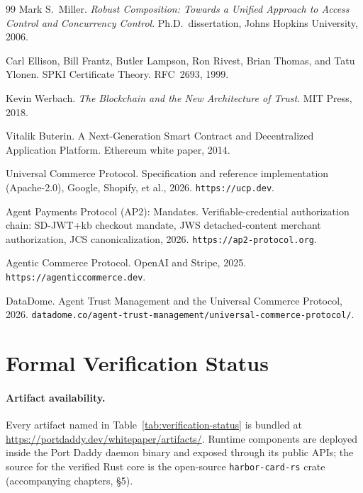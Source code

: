 \documentclass[11pt,a4paper]{article}
\theoremstyle{definition}
\theoremstyle{remark}
\begin{document}
\begin{thebibliography}{99}
Mark S.\ Miller.
\newblock \textit{Robust Composition: Towards a Unified Approach to Access Control and Concurrency Control}.
\newblock Ph.D.\ dissertation, Johns Hopkins University, 2006.

Carl Ellison, Bill Frantz, Butler Lampson, Ron Rivest, Brian Thomas, and Tatu Ylonen.
\newblock SPKI Certificate Theory.
\newblock RFC~2693, 1999.

Kevin Werbach.
\newblock \textit{The Blockchain and the New Architecture of Trust}.
\newblock MIT Press, 2018.

Vitalik Buterin.
\newblock A Next-Generation Smart Contract and Decentralized Application Platform.
\newblock Ethereum white paper, 2014.

Universal Commerce Protocol.
\newblock Specification and reference implementation (Apache-2.0), Google, Shopify, et al., 2026.
\newblock \texttt{https://ucp.dev}.

Agent Payments Protocol (AP2): Mandates.
\newblock Verifiable-credential authorization chain: SD-JWT+kb checkout mandate, JWS detached-content merchant authorization, JCS canonicalization, 2026.
\newblock \texttt{https://ap2-protocol.org}.

Agentic Commerce Protocol.
\newblock OpenAI and Stripe, 2025.
\newblock \texttt{https://agenticcommerce.dev}.

DataDome.
\newblock Agent Trust Management and the Universal Commerce Protocol, 2026.
\newblock \texttt{datadome.co/agent-trust-management/universal-commerce-protocol/}.

\end{thebibliography}

\appendix

\section{Formal Verification Status}\label{app:mech}

\paragraph{Artifact availability.} Every artifact named in Table~\ref{tab:verification-status} is bundled at \url{https://portdaddy.dev/whitepaper/artifacts/}. Runtime components are deployed inside the Port Daddy daemon binary and exposed through its public APIs; the source for the verified Rust core is the open-source \texttt{harbor-card-rs} crate (accompanying chapters, \S5).
\end{document}
